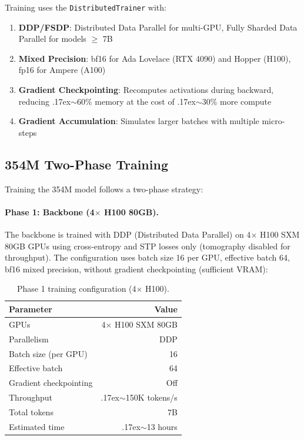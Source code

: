 Training uses the \texttt{DistributedTrainer} with:

\begin{enumerate}
    \item \textbf{DDP/FSDP}: Distributed Data Parallel for multi-GPU,
    Fully Sharded Data Parallel for models $\geq$ 7B
    \item \textbf{Mixed Precision}: bf16 for Ada Lovelace (RTX 4090) and
    Hopper (H100), fp16 for Ampere (A100)
    \item \textbf{Gradient Checkpointing}: Recomputes activations during
    backward, reducing {\raise.17ex\hbox{$\scriptstyle\sim$}}60\% memory
    at the cost of {\raise.17ex\hbox{$\scriptstyle\sim$}}30\% more compute
    \item \textbf{Gradient Accumulation}: Simulates larger batches with
    multiple micro-steps
\end{enumerate}

\subsection{354M Two-Phase Training}

Training the 354M model follows a two-phase strategy:

\paragraph{Phase 1: Backbone (4$\times$ H100 80GB).}
The backbone is trained with DDP (Distributed Data Parallel) on 4$\times$ H100 SXM 80GB
GPUs using cross-entropy and STP losses only (tomography disabled for throughput).
The configuration uses batch size 16 per GPU, effective batch 64, bf16 mixed precision,
without gradient checkpointing (sufficient VRAM):

\begin{table}[H]
\centering
\caption{Phase 1 training configuration (4$\times$ H100).}
\label{tab:phase1}
\begin{tabular}{lr}
\toprule
\textbf{Parameter} & \textbf{Value} \\
\midrule
GPUs & 4$\times$ H100 SXM 80GB \\
Parallelism & DDP \\
Batch size (per GPU) & 16 \\
Effective batch & 64 \\
Gradient checkpointing & Off \\
Throughput & {\raise.17ex\hbox{$\scriptstyle\sim$}}150K tokens/s \\
Total tokens & 7B \\
Estimated time & {\raise.17ex\hbox{$\scriptstyle\sim$}}13 hours \\
\bottomrule
\end{tabular}
\end{table}

